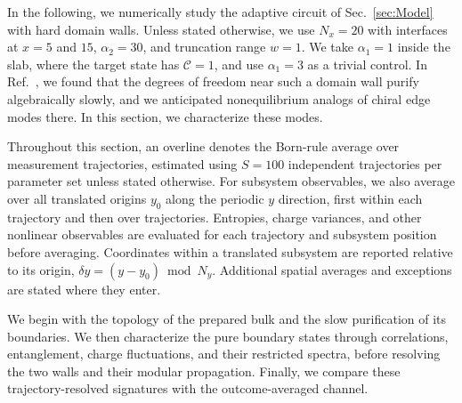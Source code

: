 \documentclass[aps,prb,10pt,twocolumn,superscriptaddress,longbibliography,floatfix]{revtex4-2}
\newcommand{\mc}[1]{\mathcal{#1}}
\begin{document}
In the following, we numerically study the adaptive circuit of Sec.~\ref{sec:Model} with hard domain walls. Unless stated otherwise, we use $N_x=20$ with interfaces at $x=5$ and $15$, $\alpha_2=30$, and truncation range $w=1$. We take $\alpha_1=1$ inside the slab, where the target state has $\mc C=1$, and use $\alpha_1=3$ as a trivial control. In Ref.~\cite{BhuiyanPanJian2026}, we found that the degrees of freedom near such a domain wall purify algebraically slowly, and we anticipated nonequilibrium analogs of chiral edge modes there. In this section, we characterize these modes.
{\color{blue}
Throughout this section, an overline denotes the Born-rule average over measurement trajectories, estimated using $S=100$ independent trajectories per parameter set unless stated otherwise. For subsystem observables, we also average over all translated origins $y_0$ along the periodic $y$ direction, first within each trajectory and then over trajectories. Entropies, charge variances, and other nonlinear observables are evaluated for each trajectory and subsystem position before averaging. Coordinates within a translated subsystem are reported relative to its origin, $\delta y=(y-y_0)\bmod N_y$. Additional spatial averages and exceptions are stated where they enter.

We begin with the topology of the prepared bulk and the slow purification of its boundaries. We then characterize the pure boundary states through correlations, entanglement, charge fluctuations, and their restricted spectra, before resolving the two walls and their modular propagation. Finally, we compare these trajectory-resolved signatures with the outcome-averaged channel.
}
\end{document}
